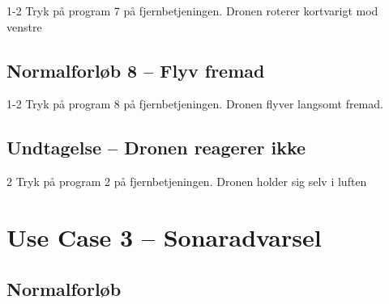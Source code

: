 \documentclass[Main]{subfiles}
\begin{document}
\begin{TestCase}
\TC
{1-2}
{Tryk på program 7 på fjernbetjeningen.}
{Dronen roterer kortvarigt mod venstre}
{}
\end{TestCase}




\subsection*{Normalforløb 8 -- Flyv fremad}

\begin{TestCaseIntro}
\end{TestCaseIntro}

\begin{TestCase}
\TC
{1-2}
{Tryk på program 8 på fjernbetjeningen.}
{Dronen flyver langsomt fremad.}
{}
\end{TestCase}





\subsection*{Undtagelse -- Dronen reagerer ikke}

\begin{TestCaseIntro}
\end{TestCaseIntro}

\begin{TestCase}
\TC
{2}
{Tryk på program 2 på fjernbetjeningen.}
{Dronen holder sig selv i luften}
{}
\end{TestCase}









\newpage
\section{Use Case 3 -- Sonaradvarsel}

\subsection*{Normalforløb}
\end{document}
